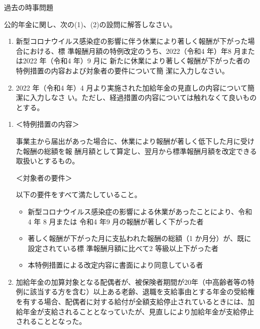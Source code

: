 \begin{explanationbox}
  過去の時事問題
\end{explanationbox}

\begin{shortanswer}[年金1 2022 問題2(3)]
  公的年金に関し、次の(1)、(2)の設問に解答しなさい。 

  \begin{enumerate}[(1)]
    \item 新型コロナウイルス感染症の影響に伴う休業により著しく報酬が下がった場合における、標
準報酬月額の特例改定のうち、2022（令和4 年）年8 月または2022 年（令和4 年）9 月に
新たに休業により著しく報酬が下がった者の特例措置の内容および対象者の要件について簡
潔に入力しなさい。
  \item 2022 年（令和4 年）4 月より実施された加給年金の見直しの内容について簡潔に入力しなさ
い。ただし、経過措置の内容については触れなくて良いものとする。
  \end{enumerate}

\end{shortanswer}

\begin{answerbox}
    \begin{enumerate}[(1)]
    \item ＜特例措置の内容＞
    
事業主から届出があった場合に、休業により報酬が著しく低下した月に受けた報酬の総額を報
酬月額として算定し、翌月から標準報酬月額を改定できる取扱いとするもの。

＜対象者の要件＞

以下の要件をすべて満たしていること。
\begin{itemize}
  \item 新型コロナウイルス感染症の影響による休業があったことにより、令和 4 年 8 月または
令和4 年9 月の報酬が著しく下がった者
\item 著しく報酬が下がった月に支払われた報酬の総額（1 か月分）が、既に設定されている標
準報酬月額に比べて2 等級以上下がった者
\item 本特例措置による改定内容に書面により同意している者
\end{itemize}
  \;

  \item 加給年金の加算対象となる配偶者が、被保険者期間が20年（中高齢者等の特例に該当する方を含む）以上ある老齢、退職を支給事由とする年金の受給権を有する場合、配偶者に対する給付が全額支給停止されているときには、加給年金が支給されることとなっていたが、見直しにより加給年金が支給停止されることとなった。
  \end{enumerate}

\end{answerbox}

